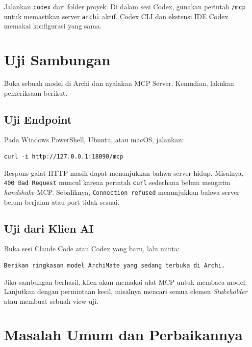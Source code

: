 Jalankan \texttt{codex} dari folder proyek. Di dalam sesi Codex, gunakan
perintah \texttt{/mcp} untuk memastikan server \texttt{archi} aktif. Codex CLI
dan ekstensi IDE Codex memakai konfigurasi yang sama.

\section{Uji Sambungan}

Buka sebuah model di Archi dan nyalakan MCP Server. Kemudian, lakukan
pemeriksaan berikut.

\subsection{Uji Endpoint}

Pada Windows PowerShell, Ubuntu, atau macOS, jalankan:

\begin{lstlisting}
curl -i http://127.0.0.1:18090/mcp
\end{lstlisting}

Respons galat HTTP masih dapat menunjukkan bahwa server hidup. Misalnya,
\texttt{400 Bad Request} muncul karena perintah \texttt{curl} sederhana belum
mengirim \emph{handshake} MCP. Sebaliknya, \texttt{Connection refused}
menunjukkan bahwa server belum berjalan atau port tidak sesuai.

\subsection{Uji dari Klien AI}

Buka sesi Claude Code atau Codex yang baru, lalu minta:

\begin{lstlisting}
Berikan ringkasan model ArchiMate yang sedang terbuka di Archi.
\end{lstlisting}

Jika sambungan berhasil, klien akan memakai alat MCP untuk membaca model.
Lanjutkan dengan permintaan kecil, misalnya mencari semua elemen
\emph{Stakeholder} atau membuat sebuah view uji.

\section{Masalah Umum dan Perbaikannya}

